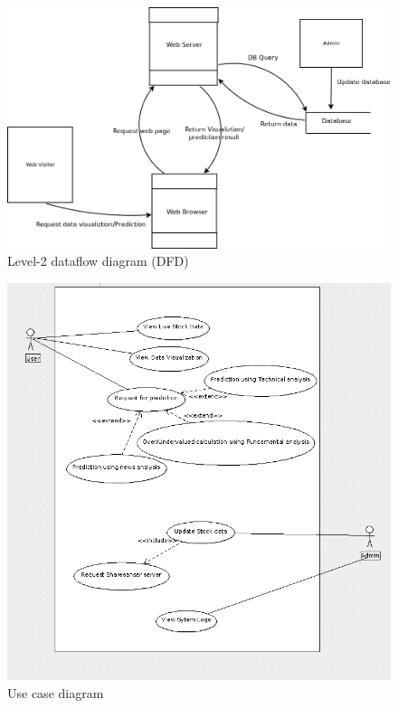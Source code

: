 ~

\begin{figure}[H]\centering
  \includegraphics[width=6in]{fig/DFD2}
  \caption{Level-2 dataflow diagram (DFD)}
  \label{fig:DFD2}
\end{figure}


\begin{figure}[H]\centering
  \includegraphics[width=6.5in]{fig/usecase2}
  \caption{Use case diagram}
  \label{fig:usecase2}
\end{figure}

